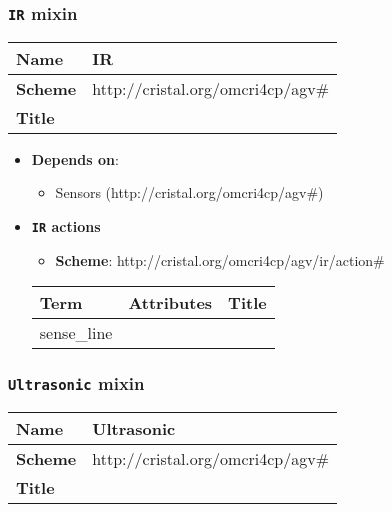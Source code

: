  
\subsubsection{\texttt{IR} mixin}
\begin{center}
\begin{tabular}{|l|l|}
  \hline
  \textbf{Name} & IR \\
  \hline  
  \textbf{Scheme} & http://cristal.org/omcri4cp/agv\# \\
  \hline
  \textbf{Title} &  \\
  \hline
\end{tabular}
\end{center}

\begin{itemize}
\item \textbf{Depends on}:
\begin{itemize}
	\item Sensors (http://cristal.org/omcri4cp/agv\#)
\end{itemize}
\end{itemize}


\begin{itemize}
\item \textbf{\texttt{IR} actions}

\begin{itemize}
	\item \textbf{Scheme}: http://cristal.org/omcri4cp/agv/ir/action\#
\end{itemize}

\begin{center}
\begin{tabular}{|l|l|l|}
  \hline
  \textbf{Term}  & \textbf{Attributes} & \textbf{Title} \\
  \hline  
  sense\_line & &  \\
  \hline
\end{tabular}
\end{center}
\end{itemize}

 
\subsubsection{\texttt{Ultrasonic} mixin}
\begin{center}
\begin{tabular}{|l|l|}
  \hline
  \textbf{Name} & Ultrasonic \\
  \hline  
  \textbf{Scheme} & http://cristal.org/omcri4cp/agv\# \\
  \hline
  \textbf{Title} &  \\
  \hline
\end{tabular}
\end{center}

